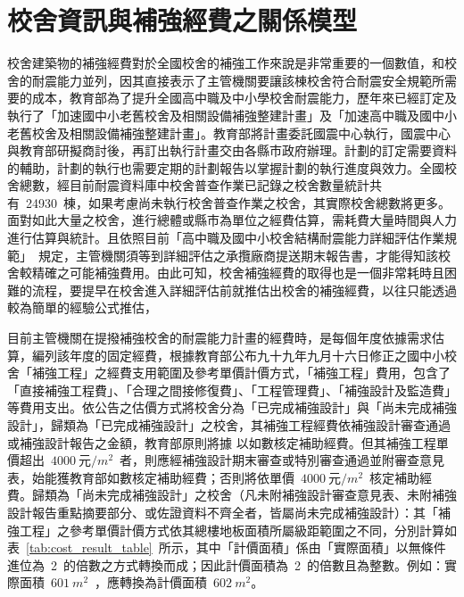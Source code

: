 \renewcommand\thetable{\arabic{chapter}-\arabic{table}}
\chapter{校舍資訊與補強經費之關係模型}

校舍建築物的補強經費對於全國校舍的補強工作來說是非常重要的一個數值，和校舍的耐震能力並列，因其直接表示了主管機關要讓該棟校舍符合耐震安全規範所需要的成本，教育部為了提升全國高中職及中小學校舍耐震能力，歷年來已經訂定及執行了「加速國中小老舊校舍及相關設備補強整建計畫」及「加速高中職及國中小老舊校舍及相關設備補強整建計畫」。教育部將計畫委託國震中心執行，國震中心與教育部研擬商討後，再訂出執行計畫交由各縣市政府辦理。計劃的訂定需要資料的輔助，計劃的執行也需要定期的計劃報告以掌握計劃的執行進度與效力。全國校舍總數，經目前耐震資料庫中校舍普查作業已記錄之校舍數量統計共有~24930~棟，如果考慮尚未執行校舍普查作業之校舍，其實際校舍總數將更多。面對如此大量之校舍，進行總體或縣市為單位之經費估算，需耗費大量時間與人力進行估算與統計。且依照目前「高中職及國中小校舍結構耐震能力詳細評估作業規範」\cite{ncree2013moe}~規定，主管機關須等到詳細評估之承攬廠商提送期末報告書，才能得知該校舍較精確之可能補強費用。由此可知，校舍補強經費的取得也是一個非常耗時且困難的流程，要提早在校舍進入詳細評估前就推估出校舍的補強經費，以往只能透過較為簡單的經驗公式推估，

目前主管機關在提撥補強校舍的耐震能力計畫的經費時，是每個年度依據需求估算，編列該年度的固定經費，根據教育部公布九十九年九月十六日修正之國中小校舍「補強工程」之經費支用範圍及參考單價計價方式，「補強工程」費用，包含了「直接補強工程費」、「合理之間接修復費」、「工程管理費」、「補強設計及監造費」等費用支出。依公告之估價方式將校舍分為「已完成補強設計」與「尚未完成補強設計」，歸類為「已完成補強設計」之校舍，其補強工程經費依補強設計審查通過或補強設計報告之金額，教育部原則將據 以如數核定補助經費。但其補強工程單價超出~$4000~\text{元}/m^2$~者，則應經補強設計期末審查或特別審查通過並附審查意見表，始能獲教育部如數核定補助經費；否則將依單價~$4000~\text{元}/m^2$~核定補助經費。歸類為「尚未完成補強設計」之校舍（凡未附補強設計審查意見表、未附補強設計報告重點摘要部分、或佐證資料不齊全者，皆屬尚未完成補強設計）：其「補強工程」之參考單價計價方式依其總樓地板面積所屬級距範圍之不同，分別計算如表~\ref{tab:cost_result_table}\cite{ncree2010moe}~所示，其中「計價面積」係由「實際面積」以無條件進位為~2~的倍數之方式轉換而成；因此計價面積為~2~的倍數且為整數。例如：實際面積~$601~m^2$~，應轉換為計價面積~$602~m^2$。

